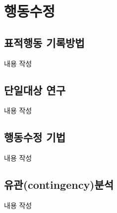\section{행동수정}

\subsection{표적행동 기록방법}
내용 작성

\subsection{단일대상 연구}
내용 작성

\subsection{행동수정 기법}
내용 작성

\subsection{유관(contingency)분석}
내용 작성
